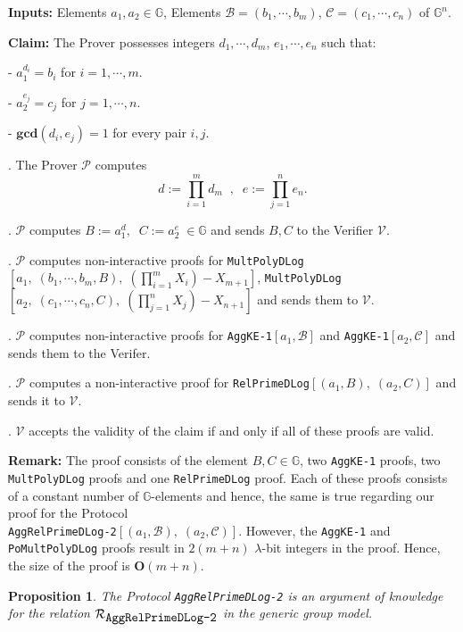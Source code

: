 \documentclass[11pt, lettersize, notitlepage, leqno, footskip=0.6cm]{article}
\newcommand{\pl}{\prod\limits}
\newcommand{\mc}{\mathcal}
\newcommand{\mb}{\mathbb}
\newcommand{\mbf}{\mathbf}
\newcommand{\lamb}{\lambda}
\newcommand{\vs}{\vspace{-0.15cm}}
\newcommand{\GCD}{\mbf{gcd}}
\newtheorem{Prop}[Thm]{Proposition}
\numberwithin{equation}{section}
\begin{document}
\noindent \textbf{Inputs:} Elements $a_1, a_2\in \mb{G}$, Elements $\mc{B} = (b_1,\cdots, b_m)$, $\mc{C} = (c_1,\cdots, c_n)$ of $\mb{G}^n$.

\noindent \textbf{Claim:} The Prover possesses integers $d_1,\cdots, d_m$,\; $e_1,\cdots,e_n$ such that:

\noindent - $a_1^{d_i} = b_i$ for $i = 1,\cdots, m$.

\noindent - $a_2^{e_j} = c_j$ for $j = 1,\cdots, n$.

\noindent - $\GCD(d_i, e_j) = 1$ for every pair $i, j$.


\begin{prf1}. The Prover $\mc{P}$ computes \vs $${d}:= \pl_{i=1}^m d_m\;\;,\;\; {e}:= \pl_{j=1}^n e_n.$$

. $\mc{P}$ computes $B:= a_1^{d},\;\;C:= a_2^{e}\;\in\mb{G}$ and sends $B, C$ to the Verifier $\mc{V}$.

. $\mc{P}$ computes non-interactive proofs for \verb|MultPolyDLog|$[a_1,\;(b_1,\cdots,b_m, B),\; (\pl_{i=1}^m X_i) -X_{m+1}]$, \verb|MultPolyDLog|$[a_2,\;(c_1,\cdots,c_n, C),\; (\pl_{j=1}^n X_j) -X_{n+1}]$ and sends them to $\mc{V}$.

. $\mc{P}$ computes non-interactive proofs for 
\verb|AggKE-1|$[a_1,\mc{B}]$ and \verb|AggKE-1|$[a_2,\mc{C}]$ and sends them to the Verifer.

. $\mc{P}$ computes a non-interactive proof for 
\verb|RelPrimeDLog|$[(a_1, B),\;(a_2, C)]$ and sends it to $\mc{V}$. 

. $\mc{V}$ accepts the validity of the claim if and only if all of these proofs are valid.\end{prf1}

\vspace{0.2cm}

\noindent \textbf{Remark:} The proof consists of the element $B, C \in \mb{G}$, two \verb|AggKE-1| proofs, two \verb|MultPolyDLog| proofs and one \verb|RelPrimeDLog| proof. Each of these proofs consists of a constant number of $\mb{G}$-elements and hence, the same is true regarding our proof for the Protocol\\ \verb|AggRelPrimeDLog-2|$[(a_1, \mc{B}), \; (a_2, \mc{C})]$. However, the \verb|AggKE-1| and \verb|PoMultPolyDLog| proofs result in $2(m+n)$ $\lamb$-bit integers in the proof. Hence, the size of the proof is $\mbf{O}(m+n)$. \vspace{0.2cm}


\begin{Prop} The Protocol \verb|AggRelPrimeDLog-2| is an argument of knowledge for the relation $\mc{R}_{{\protect\verb|AggRelPrimeDLog-2|}}$ in the generic group
model.\end{Prop}
\end{document}
